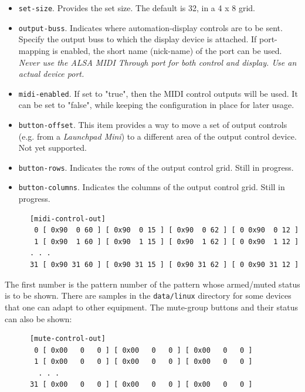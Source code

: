    \begin{itemize}
      \item \texttt{set-size}.
         Provides the set size.  The default is 32, in a 4 x 8 grid.
      \item \texttt{output-buss}.
         Indicates where automation-display controls are to be sent.
         Specify the output buss to which the display device is attached. If
         port-mapping is enabled, the short name (nick-name) of the port can be
         used.
         \textsl{Never use the ALSA MIDI Through port for both control
         and display. Use an actual device port.}
      \item \texttt{midi-enabled}.
         If set to "true", then the MIDI control outputs will be used.
         It can be set to "false", while keeping the configuration in place
         for later usage.
      \item \texttt{button-offset}.
         This item provides a way to move a set of output controls (e.g. from a
         \textsl{Launchpad Mini}) to a different area of the output control
         device.  Not yet supported.
      \item \texttt{button-rows}.
         Indicates the rows of the output control grid.
         Still in progress.
      \item \texttt{button-columns}.
         Indicates the columns of the output control grid.
         Still in progress.
   \end{itemize}

   \begin{verbatim}
      [midi-control-out]
       0 [ 0x90  0 60 ] [ 0x90  0 15 ] [ 0x90  0 62 ] [ 0 0x90  0 12 ]
       1 [ 0x90  1 60 ] [ 0x90  1 15 ] [ 0x90  1 62 ] [ 0 0x90  1 12 ]
      . . .
      31 [ 0x90 31 60 ] [ 0x90 31 15 ] [ 0x90 31 62 ] [ 0 0x90 31 12 ]
   \end{verbatim}

   The first number is the pattern number of the pattern whose armed/muted
   status is to be shown.
   There are samples in the \texttt{data/linux} directory for some devices that
   one can adapt to other equipment.
   The mute-group buttons and their status can also be shown:

   \begin{verbatim}
      [mute-control-out]
       0 [ 0x00   0   0 ] [ 0x00   0   0 ] [ 0x00   0   0 ]
       1 [ 0x00   0   0 ] [ 0x00   0   0 ] [ 0x00   0   0 ]
        . . .
      31 [ 0x00   0   0 ] [ 0x00   0   0 ] [ 0x00   0   0 ]
   \end{verbatim}

